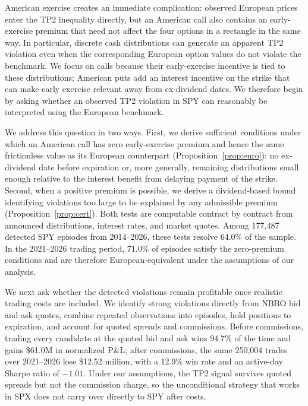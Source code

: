 \documentclass[sigconf,review,anonymous]{acmart}
\begin{document}
American exercise creates an immediate complication: observed European prices enter the TP2 inequality directly, but an American call also contains an early-exercise premium that need not affect the four options in a rectangle in the same way. In particular, discrete cash distributions can generate an apparent TP2 violation even when the corresponding European option values do not violate the benchmark. We focus on calls because their early-exercise incentive is tied to these distributions; American puts add an interest incentive on the strike that can make early exercise relevant away from ex-dividend dates. We therefore begin by asking whether an observed TP2 violation in SPY can reasonably be interpreted using the European benchmark.

We address this question in two ways. First, we derive sufficient conditions under which an American call has zero early-exercise premium and hence the same frictionless value as its European counterpart (Proposition~\ref{prop:euro}): no ex-dividend date before expiration or, more generally, remaining distributions small enough relative to the interest benefit from delaying payment of the strike. Second, when a positive premium is possible, we derive a dividend-based bound identifying violations too large to be explained by any admissible premium (Proposition~\ref{prop:cert}). Both tests are computable contract by contract from announced distributions, interest rates, and market quotes. Among 177{,}487 detected SPY episodes from 2014--2026, these tests resolve 64.0\% of the sample. In the 2021--2026 trading period, 71.0\% of episodes satisfy the zero-premium conditions and are therefore European-equivalent under the assumptions of our analysis.

We next ask whether the detected violations remain profitable once realistic trading costs are included. We identify strong violations directly from NBBO bid and ask quotes, combine repeated observations into episodes, hold positions to expiration, and account for quoted spreads and commissions. Before commissions, trading every candidate at the quoted bid and ask wins 94.7\% of the time and gains \$61.0M in normalized P\&L; after commissions, the same 250{,}004 trades over 2021--2026 lose \$12.52 million, with a 12.9\% win rate and an active-day Sharpe ratio of $-1.01$. Under our assumptions, the TP2 signal survives quoted spreads but not the commission charge, so the unconditional strategy that works in SPX does not carry over directly to SPY after costs.
\end{document}
